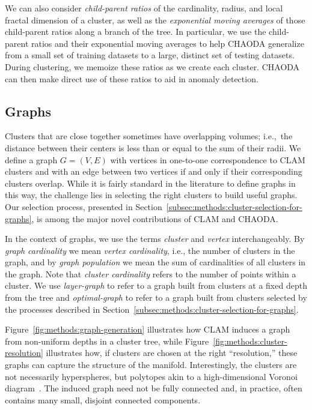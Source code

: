 We can also consider \textit{child-parent ratios} of the cardinality, radius, and local fractal dimension of a cluster, as well as the \textit{exponential moving averages} of those child-parent ratios along a branch of the tree.
In particular, we use the child-parent ratios and their exponential moving averages to help CHAODA generalize from a small set of training datasets to a large, distinct set of testing datasets.
During clustering, we memoize these ratios as we create each cluster.
CHAODA can then make direct use of these ratios to aid in anomaly detection.


\subsection{Graphs}
\label{subsec:methods:graphs}

Clusters that are close together sometimes have overlapping volumes; i.e.,\ the distance between their centers is less than or equal to the sum of their radii.
We define a graph $G=(V,E)$ with vertices in one-to-one correspondence to CLAM clusters and with an edge between two vertices if and only if their corresponding clusters overlap.
While it is fairly standard in the literature to define graphs in this way, the challenge lies in selecting the right clusters to build useful graphs.
Our selection process, presented in Section~\ref{subsec:methods:cluster-selection-for-graphs}, is among the major novel contributions of CLAM and CHAODA.

In the context of graphs, we use the terms \textit{cluster} and \textit{vertex} interchangeably.
By \textit{graph cardinality} we mean \textit{vertex cardinality}, i.e., the number of clusters in the graph, and by \textit{graph population} we mean the sum of cardinalities of all clusters in the graph.
Note that \textit{cluster cardinality} refers to the number of points within a cluster.
We use \textit{layer-graph} to refer to a graph built from clusters at a fixed depth from the tree and \textit{optimal-graph} to refer to a graph built from clusters selected by the processes described in Section~\ref{subsec:methods:cluster-selection-for-graphs}.

Figure~\ref{fig:methods:graph-generation} illustrates how CLAM induces a graph from non-uniform depths in a cluster tree, while Figure~\ref{fig:methods:cluster-resolution} illustrates how, if clusters are chosen at the right ``resolution,'' these graphs can capture the structure of the manifold.
Interestingly, the clusters are not necessarily hyperspheres, but polytopes akin to a high-dimensional Voronoi diagram~\cite{voronoi1908nouvelles}.
The induced graph need not be fully connected and, in practice, often contains many small, disjoint connected components.

